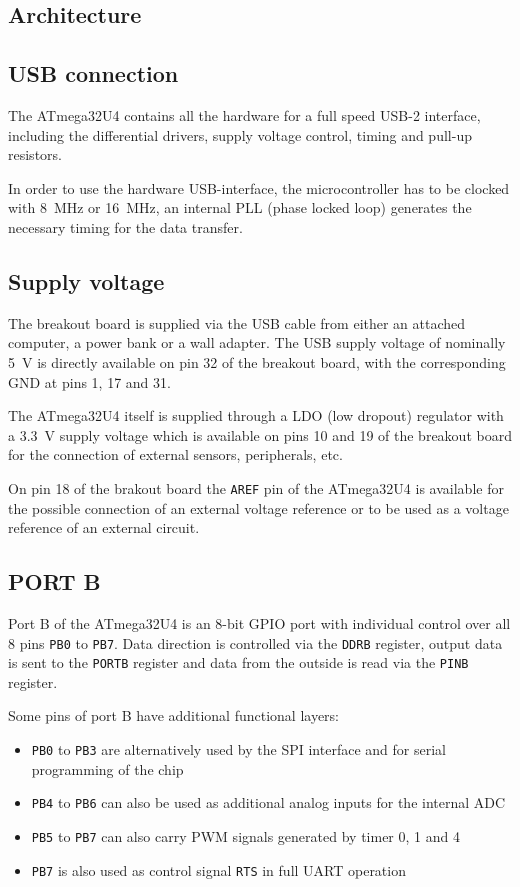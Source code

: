 \begin{multicols}{2}
\section{Architecture}
\subsection{USB connection}
  The ATmega32U4 contains all the hardware for a full speed USB-2 interface,
  including the differential drivers, supply voltage control, timing and
  pull-up resistors.

  In order to use the hardware USB-interface, the microcontroller has to be
  clocked with \SI{8}{\mega\hertz} or \SI{16}{\mega\hertz}, an internal PLL
  (phase locked loop) generates the necessary timing for the data transfer.

\subsection{Supply voltage}
  The breakout board is supplied via the USB cable from either an attached computer,
  a power bank or a wall adapter. The USB supply voltage of nominally \SI{5}{\volt}
  is directly available on pin 32 of the breakout board, with the corresponding GND
  at pins 1, 17 and 31.

  The ATmega32U4 itself is supplied through a LDO (low dropout) regulator with
  a \SI{3.3}{\volt} supply voltage which is available on pins 10 and 19 of the
  breakout board for the connection of external sensors, peripherals, etc.

  On pin 18 of the brakout board the \lstinline!AREF! pin of the ATmega32U4 is available
  for the possible connection of an external voltage reference or to be used as a
  voltage reference of an external circuit.

\subsection{PORT B}
  Port B of the ATmega32U4 is an 8-bit GPIO port with individual control over
  all 8 pins \lstinline!PB0! to \lstinline!PB7!. Data direction is controlled via the \lstinline!DDRB!
  register, output data is sent to the \lstinline!PORTB! register and
  data from the outside is read via the \lstinline!PINB! register.

  Some pins of port B have additional functional layers:
  \begin{itemize}\tightlist
    \item \lstinline!PB0! to \lstinline!PB3! are alternatively used by the SPI interface and for serial programming of the chip
    \item \lstinline!PB4! to \lstinline!PB6! can also be used as additional analog inputs for the internal ADC
    \item \lstinline!PB5! to \lstinline!PB7! can also carry PWM signals generated by timer 0, 1 and 4
    \item \lstinline!PB7! is also used as control signal \lstinline!RTS! in full UART operation
  \end{itemize}


\end{multicols}
